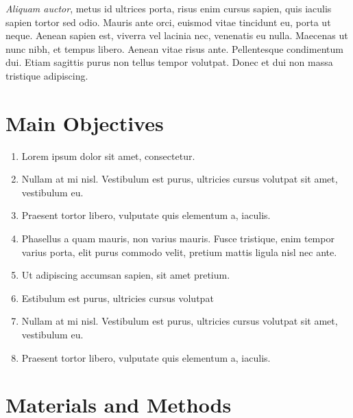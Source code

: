 \documentclass[a0,portrait]{a0poster}
\begin{document}
\begin{multicols}{2}
\textit{Aliquam auctor}, metus id ultrices porta, risus enim cursus
sapien, quis iaculis sapien tortor sed odio. Mauris ante orci, euismod
vitae tincidunt eu, porta ut neque. Aenean sapien est, viverra vel
lacinia nec, venenatis eu nulla. Maecenas ut nunc nibh, et tempus
libero. Aenean vitae risus ante. Pellentesque condimentum dui. Etiam
sagittis purus non tellus tempor volutpat. Donec et dui non massa
tristique adipiscing.


\color{DarkSlateGray} %

\section*{Main Objectives}

\begin{enumerate}
\item Lorem ipsum dolor sit amet, consectetur.
\item Nullam at mi nisl. Vestibulum est purus, ultricies cursus volutpat sit amet, vestibulum eu.
\item Praesent tortor libero, vulputate quis elementum a, iaculis.
\item Phasellus a quam mauris, non varius mauris. Fusce tristique, enim tempor varius porta, elit purus commodo velit, pretium mattis ligula nisl nec ante.
\item Ut adipiscing accumsan sapien, sit amet pretium.
\item Estibulum est purus, ultricies cursus volutpat
\item Nullam at mi nisl. Vestibulum est purus, ultricies cursus volutpat sit amet, vestibulum eu.
\item Praesent tortor libero, vulputate quis elementum a, iaculis.
\end{enumerate}


\section*{Materials and Methods}


\end{multicols}
\end{document}
